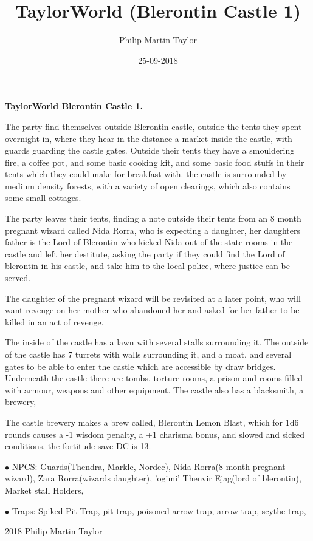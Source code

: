 \documentclass[12pt,a4paper]{book}
\date{25-09-2018}
\author{Philip Martin Taylor}
\title{TaylorWorld (Blerontin Castle 1)}
\begin{document}
\begin{center}
\textbf{TaylorWorld\texttrademark \: Blerontin Castle 1.}
\end{center}
\begin{flushleft}
  The party find themselves outside Blerontin castle, outside the tents they spent overnight in, where they hear in the distance a market inside the castle, with guards guarding the castle gates. Outside their tents they have a smouldering fire, a coffee pot, and some basic cooking kit, and some basic food stuffs in their tents which they could make for breakfast with. the castle is surrounded by medium density forests, with a variety of open clearings, which also contains some small cottages.
\end{flushleft}
\begin{flushleft}
  The party leaves their tents, finding a note outside their tents from an 8 month pregnant wizard called Nida Rorra, who is expecting a daughter, her daughters father is the Lord of Blerontin who kicked Nida out of the state rooms in the castle and left her destitute, asking the party if they could find the Lord of blerontin in his castle, and take him to the local police, where justice can be served.
\end{flushleft}
\begin{flushleft}
  The daughter of the pregnant wizard will be revisited at a later point, who will want revenge on her mother who abandoned her and asked for her father to be killed in an act of revenge.
\end{flushleft}
\begin{flushleft}
  The inside of the castle has a lawn with several stalls surrounding it. The outside of the castle has 7 turrets with walls surrounding it, and a moat, and several gates to be able to enter the castle which are accessible by draw bridges. Underneath the castle there are tombs, torture rooms, a prison and rooms filled with armour, weapons and other equipment. The castle also has a blacksmith, a brewery, 
\end{flushleft}
\begin{flushleft}
  The castle brewery makes a brew called, Blerontin Lemon Blast, which for 1d6 rounds causes a -1 wisdom penalty, a +1 charisma bonus, and slowed and sicked conditions, the fortitude save DC is 13.
\end{flushleft}
\begin{flushleft}
\item[$\bullet$ NPCS:] Guards(Thendra, Markle, Nordec), Nida Rorra(8 month pregnant wizard), Zara Rorra(wizards daughter), 'ogimi' Thenvir Ejag(lord of blerontin), Market stall Holders, 
  \item[$\bullet$ Traps:] Spiked Pit Trap, pit trap, poisoned arrow trap, arrow trap, scythe trap, 
\end{flushleft}
\begin{center}
  \textcopyright{} 2018 Philip Martin Taylor
\end{center}
\end{document}
